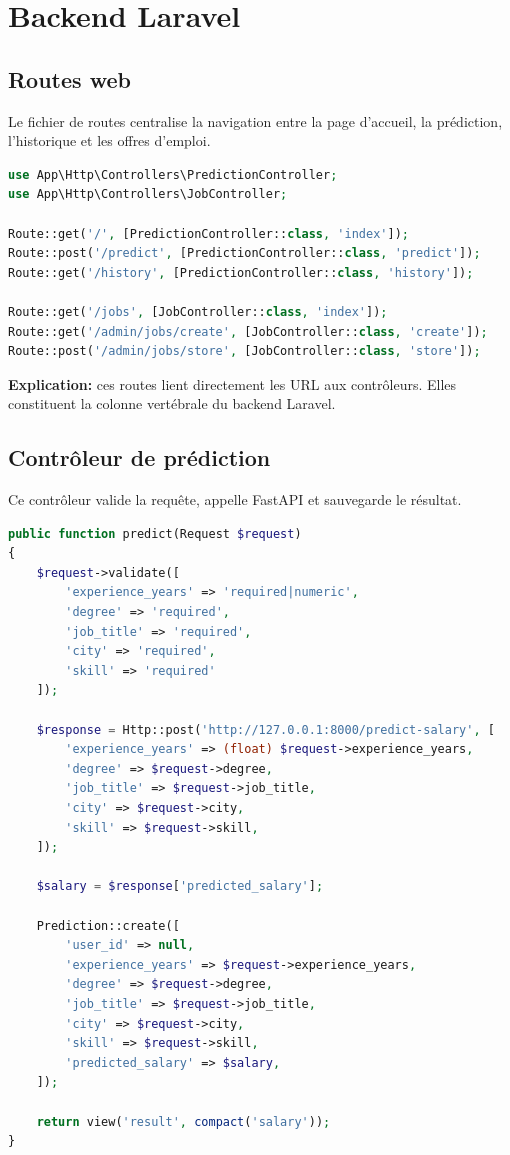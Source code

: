 \documentclass[11pt,a4paper]{article}
\begin{document}
\section{Backend Laravel}

\subsection{Routes web}
Le fichier de routes centralise la navigation entre la page d'accueil, la pr\'ediction, l'historique et les offres d'emploi.

\begin{lstlisting}[language=PHP, caption={Extrait de routes Laravel}]
use App\Http\Controllers\PredictionController;
use App\Http\Controllers\JobController;

Route::get('/', [PredictionController::class, 'index']);
Route::post('/predict', [PredictionController::class, 'predict']);
Route::get('/history', [PredictionController::class, 'history']);

Route::get('/jobs', [JobController::class, 'index']);
Route::get('/admin/jobs/create', [JobController::class, 'create']);
Route::post('/admin/jobs/store', [JobController::class, 'store']);
\end{lstlisting}

\textbf{Explication:} ces routes lient directement les URL aux contr\^oleurs. Elles constituent la colonne vert\'ebrale du backend Laravel.

\subsection{Contr\^oleur de pr\'ediction}
Ce contr\^oleur valide la requ\^ete, appelle FastAPI et sauvegarde le r\'esultat.

\begin{lstlisting}[language=PHP, caption={Extrait important de PredictionController.php}]
public function predict(Request $request)
{
    $request->validate([
        'experience_years' => 'required|numeric',
        'degree' => 'required',
        'job_title' => 'required',
        'city' => 'required',
        'skill' => 'required'
    ]);

    $response = Http::post('http://127.0.0.1:8000/predict-salary', [
        'experience_years' => (float) $request->experience_years,
        'degree' => $request->degree,
        'job_title' => $request->job_title,
        'city' => $request->city,
        'skill' => $request->skill,
    ]);

    $salary = $response['predicted_salary'];

    Prediction::create([
        'user_id' => null,
        'experience_years' => $request->experience_years,
        'degree' => $request->degree,
        'job_title' => $request->job_title,
        'city' => $request->city,
        'skill' => $request->skill,
        'predicted_salary' => $salary,
    ]);

    return view('result', compact('salary'));
}
\end{lstlisting}
\end{document}
